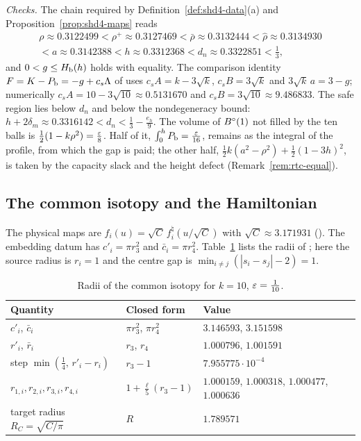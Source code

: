\emph{Checks.} The chain required by Definition~\ref{def:shd4-data}(a) and Proposition~\ref{prop:shd4-maps} reads
\begin{multline*}
 \rho\approx0.3122499<\rho^+\approx0.3127469<\bar\rho\approx0.3132444<\hat\rho\approx0.3134930\\
 <a\approx0.3142388<h\approx0.3312368<d_n\approx0.3322851<\tfrac13,
\end{multline*}
and $0<g\le H_{\mathrm b}(h)$ holds with equality. The comparison identity $F=K-P_{\mathrm b}=-g+c_s\Lambda$ of
 uses $c_sA=k-3\sqrt k$, $c_sB=3\sqrt k$ and $3\sqrt k\,a=3-g$; numerically
$c_sA=10-3\sqrt{10}\approx0.5131670$ and $c_sB=3\sqrt{10}\approx9.486833$. The safe region lies below $d_n$ and below the
nondegeneracy bound: $h+2\delta_m\approx0.3316142<d_n<\frac13-\frac{e_h}9$. The volume of $B^{\circ}(1)$ not filled by the ten
balls is $\frac12(1-k\rho^2)=\frac{\varepsilon}8$. Half of it, $\int_0^hP_{\mathrm b}=\frac{\varepsilon}{16}$, remains as the integral of the profile,
from which the gap is paid; the other half, $\frac12k(a^2-\rho^2)+\frac12(1-3h)^2$, is taken by the capacity slack and the
height defect (Remark~\ref{rem:rtc-equal}).

\subsection{The common isotopy and the Hamiltonian}

The physical maps are $f_i(u)=\sqrt C\,f^\natural_i(u/\sqrt C)$ with $\sqrt C\approx3.171931$ (). The embedding datum has $c'_i=\pi r_3^2$ and
$\bar c_i=\pi r_4^2$. Table~\ref{tab:example-ham} lists the radii of ; here the source radius is
$r_i=1$ and the centre gap is $\min_{i\ne j}(|s_i-s_j|-2)=1$.

\begin{table}[ht]
\centering\footnotesize
\renewcommand{\arraystretch}{1.15}
\begin{tabular}{@{}p{}p{}p{}@{}}
\toprule
Quantity & Closed form & Value\\
\midrule
$c'_i$, $\bar c_i$ & $\pi r_3^2$, $\pi r_4^2$ & $3.146593$, $3.151598$\\
$r'_i$, $\bar r_i$ & $r_3$, $r_4$ & $1.000796$, $1.001591$\\
step $\min(\frac14,\,r'_i-r_i)$ & $r_3-1$ & $7.955775\cdot10^{-4}$\\
$r_{1,i},r_{2,i},r_{3,i},r_{4,i}$ & $1+\frac\ell5(r_3-1)$ & $1.000159$, $1.000318$, $1.000477$, $1.000636$\\
target radius $R_C=\sqrt{C/\pi}$ & $R$ & $1.789571$\\
\bottomrule
\end{tabular}
\caption{Radii of the common isotopy for $k=10$, $\varepsilon=\frac1{10}$.}
\label{tab:example-ham}
\end{table}

